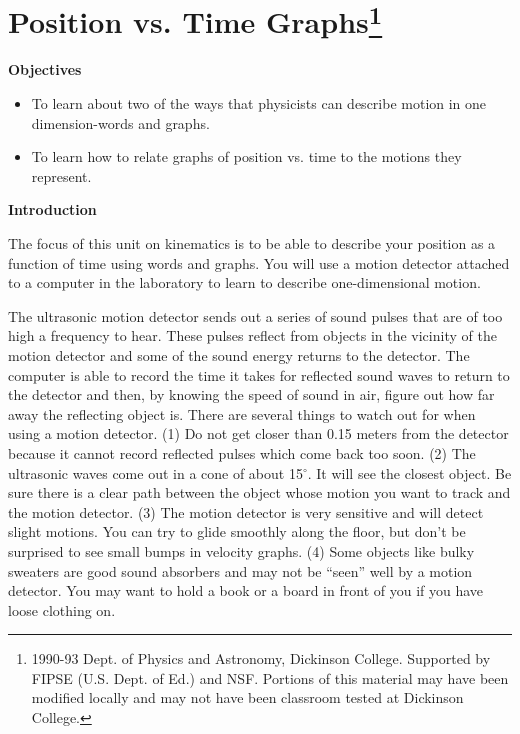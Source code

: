 
\section{Position vs. Time Graphs\footnote{
1990-93 Dept. of Physics and Astronomy, Dickinson College. Supported by FIPSE
(U.S. Dept. of Ed.) and NSF. Portions of this material may have been modified
locally and may not have been classroom tested at Dickinson College.
}}

\makelabheader %

\textbf{Objectives} 

\begin{itemize}
\item To learn about two of the ways that physicists can describe motion in one dimension-words
and graphs. 
\item To learn how to relate graphs of position vs. time to the motions they represent.
\end{itemize}
\textbf{Introduction} 

The focus of this unit on kinematics is to be able to describe your position
as a function of time using words and graphs. You will use a motion detector
attached to a computer in the laboratory to learn to describe one-dimensional
motion.

The ultrasonic motion detector sends out a series of sound pulses that are of
too high a frequency to hear. These pulses reflect from objects in the vicinity
of the motion detector and some of the sound energy returns to the detector.
The computer is able to record the time it takes for reflected sound waves to
return to the detector and then, by knowing the speed of sound in air, figure
out how far away the reflecting object is. There are several things to watch
out for when using a motion detector. (1) Do not get closer than 0.15 meters
from the detector because it cannot record reflected pulses which come back
too soon. (2) The ultrasonic waves come out in a cone of about 15\( ^{\circ } \).
It will see the closest object. Be sure there is a clear path between the object
whose motion you want to track and the motion detector. (3) The motion detector
is very sensitive and will detect slight motions. You can try to glide smoothly
along the floor, but don't be surprised to see small bumps in velocity graphs.
(4) Some objects like bulky sweaters are good sound absorbers and may not be
``seen'' well by a motion detector. You may want to hold a book
or a board in front of you if you have loose clothing on.

